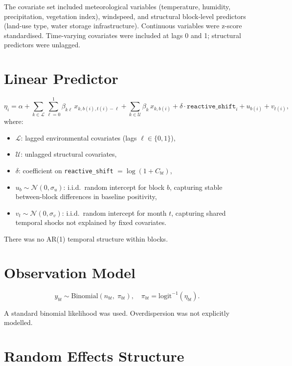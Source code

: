 \documentclass[12pt,a4paper]{article}
\begin{document}
The covariate set included meteorological variables (temperature, humidity, precipitation, vegetation index), windspeed, and structural block-level predictors (land-use type, water storage infrastructure). Continuous variables were z-score standardised. Time-varying covariates were included at lags 0 and 1; structural predictors were unlagged.

\section{Linear Predictor}

\begin{equation}
\eta_i = \alpha
  + \sum_{k \in \mathcal{L}} \sum_{\ell=0}^{1} \beta_{k\ell}\, x_{k,b(i),t(i)-\ell}
  + \sum_{k \in \mathcal{U}} \beta_k\, x_{k,b(i)}
  + \delta \cdot \texttt{reactive\_shift}_i
  + u_{b(i)} + v_{t(i)},
\end{equation}
where:
\begin{itemize}
  \item $\mathcal{L}$: lagged environmental covariates (lags $\ell \in \{0,1\}$),
  \item $\mathcal{U}$: unlagged structural covariates,
  \item $\delta$: coefficient on \texttt{reactive\_shift} $= \log(1 + C_{bt})$,
  \item $u_b \sim \mathcal{N}(0, \sigma_u)$: i.i.d.\ random intercept for block $b$, capturing stable between-block differences in baseline positivity,
  \item $v_t \sim \mathcal{N}(0, \sigma_v)$: i.i.d.\ random intercept for month $t$, capturing shared temporal shocks not explained by fixed covariates.
\end{itemize}

There was no AR(1) temporal structure within blocks.

\section{Observation Model}

\begin{equation}
y_{bt} \sim \text{Binomial}(n_{bt},\; \pi_{bt}), \quad \pi_{bt} = \text{logit}^{-1}(\eta_{bt}).
\end{equation}

A standard binomial likelihood was used. Overdispersion was not explicitly modelled.

\section{Random Effects Structure}
\end{document}
